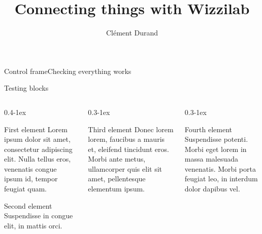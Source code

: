 \documentclass{beamerx}
\title[Stage de seconde année à l'École polytechnique]
      {Connecting things with Wizzilab}
      [Wizzilab]
\author{Clément Durand}
\begin{document}
\maketitle



\begin{frame}{Control frame}{Checking everything works}
  \lipsum[1]
\end{frame}

\begin{frame}{Testing blocks}
  \begin{columns}[t,onlytextwidth]
    \begin{column}{0.4\textwidth-1ex}
      \begin{block}{First element}
        Lorem ipsum dolor sit amet, consectetur adipiscing elit. Nulla tellus eros, venenatis congue ipsum id, tempor feugiat quam.
      \end{block}
      \begin{block}{Second element}
        Suspendisse in congue elit, in mattis orci.
      \end{block}
    \end{column}

    \begin{column}{0.3\textwidth-1ex}
      \begin{block}{Third element}
        Donec lorem lorem, faucibus a mauris et, eleifend tincidunt eros. Morbi ante metus, ullamcorper quis elit sit amet, pellentesque elementum ipsum.
      \end{block}
    \end{column}

    \begin{column}{0.3\textwidth-1ex}
      \begin{block}{Fourth element}
        Suspendisse potenti. Morbi eget lorem in massa malesuada venenatis. Morbi porta feugiat leo, in interdum dolor dapibus vel.
      \end{block}
    \end{column}
  \end{columns}
\end{frame}
\end{document}

